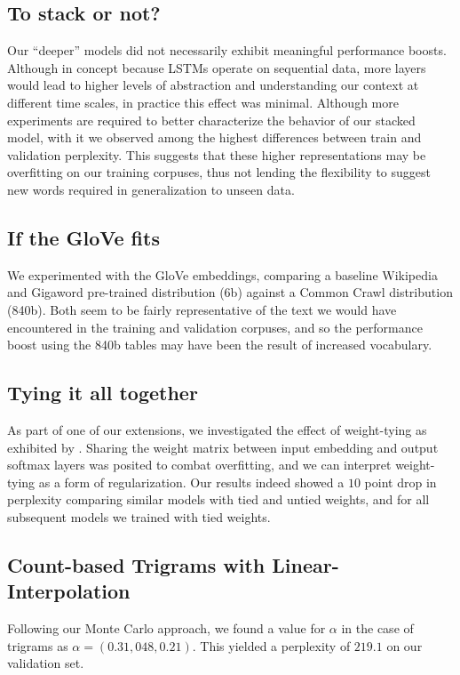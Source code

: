 \documentclass[11pt]{article}
\begin{document}
\subsection{To stack or not?}
Our ``deeper'' models did not necessarily exhibit meaningful performance boosts. Although in concept because LSTMs operate on sequential data, more layers would lead to higher levels of abstraction and understanding our context at different time scales, in practice this effect was minimal. Although more experiments are required to better characterize the behavior of our stacked model, with it we observed among the highest differences between train and validation perplexity. This suggests that these higher representations may be overfitting on our training corpuses, thus not lending the flexibility to suggest new words required in generalization to unseen data. 

\subsection{If the GloVe fits}
We experimented with the GloVe embeddings, comparing a baseline Wikipedia and Gigaword pre-trained distribution (6b) against a Common Crawl distribution (840b). Both seem to be fairly representative of the text we would have encountered in the training and validation corpuses, and so the performance boost using the 840b tables may have been the result of increased vocabulary.

\subsection{Tying it all together}
As part of one of our extensions, we investigated the effect of weight-tying as exhibited by \cite{DBLP:journals/corr/PressW16}. Sharing the weight matrix between input embedding and output softmax layers was posited to combat overfitting, and we can interpret weight-tying as a form of regularization. Our results indeed showed a $10$ point drop in perplexity comparing similar models with tied and untied weights, and for all subsequent models we trained with tied weights.

\subsection{Count-based Trigrams with Linear-Interpolation}
Following our Monte Carlo approach, we found a value for $\alpha$ in the case of trigrams as $\alpha = (0.31, 048, 0.21)$.
This yielded a perplexity of $219.1$ on our validation set.
\end{document}
